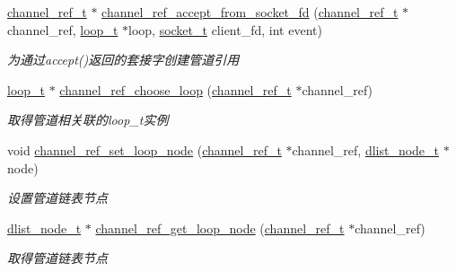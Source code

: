 \begin{DoxyCompactItemize}
\hyperlink{a00051_a151271c9d188ef28d4d24bb81dcc1263_a151271c9d188ef28d4d24bb81dcc1263}{channel\+\_\+ref\+\_\+t} $\ast$ \hyperlink{a00049_a8312d0f4fcecc79d87a261e8b462ce95_a8312d0f4fcecc79d87a261e8b462ce95}{channel\+\_\+ref\+\_\+accept\+\_\+from\+\_\+socket\+\_\+fd} (\hyperlink{a00051_a151271c9d188ef28d4d24bb81dcc1263_a151271c9d188ef28d4d24bb81dcc1263}{channel\+\_\+ref\+\_\+t} $\ast$channel\+\_\+ref, \hyperlink{a00051_a9c3ad1cd2de83e09f3a7b59fa82c94ee_a9c3ad1cd2de83e09f3a7b59fa82c94ee}{loop\+\_\+t} $\ast$loop, \hyperlink{a00051_a0d9e0afbf02fb6ed6c5b1415dce51b05_a0d9e0afbf02fb6ed6c5b1415dce51b05}{socket\+\_\+t} client\+\_\+fd, int event)
\begin{DoxyCompactList}\small\item\em 为通过accept()返回的套接字创建管道引用 \end{DoxyCompactList}\item 
\hyperlink{a00051_a9c3ad1cd2de83e09f3a7b59fa82c94ee_a9c3ad1cd2de83e09f3a7b59fa82c94ee}{loop\+\_\+t} $\ast$ \hyperlink{a00049_af3fce9f1faac3773f726b1b913d42787_af3fce9f1faac3773f726b1b913d42787}{channel\+\_\+ref\+\_\+choose\+\_\+loop} (\hyperlink{a00051_a151271c9d188ef28d4d24bb81dcc1263_a151271c9d188ef28d4d24bb81dcc1263}{channel\+\_\+ref\+\_\+t} $\ast$channel\+\_\+ref)
\begin{DoxyCompactList}\small\item\em 取得管道相关联的loop\+\_\+t实例 \end{DoxyCompactList}\item 
void \hyperlink{a00049_a98676b725d853de8a576f97e1eeb9068_a98676b725d853de8a576f97e1eeb9068}{channel\+\_\+ref\+\_\+set\+\_\+loop\+\_\+node} (\hyperlink{a00051_a151271c9d188ef28d4d24bb81dcc1263_a151271c9d188ef28d4d24bb81dcc1263}{channel\+\_\+ref\+\_\+t} $\ast$channel\+\_\+ref, \hyperlink{a00051_a62053232bcf3566010ef98a7d77c3cc8_a62053232bcf3566010ef98a7d77c3cc8}{dlist\+\_\+node\+\_\+t} $\ast$node)
\begin{DoxyCompactList}\small\item\em 设置管道链表节点 \end{DoxyCompactList}\item 
\hyperlink{a00051_a62053232bcf3566010ef98a7d77c3cc8_a62053232bcf3566010ef98a7d77c3cc8}{dlist\+\_\+node\+\_\+t} $\ast$ \hyperlink{a00049_a814d6826477cb62c5e4d6826dfdc418e_a814d6826477cb62c5e4d6826dfdc418e}{channel\+\_\+ref\+\_\+get\+\_\+loop\+\_\+node} (\hyperlink{a00051_a151271c9d188ef28d4d24bb81dcc1263_a151271c9d188ef28d4d24bb81dcc1263}{channel\+\_\+ref\+\_\+t} $\ast$channel\+\_\+ref)
\begin{DoxyCompactList}\small\item\em 取得管道链表节点 \end{DoxyCompactList}\item 

\end{DoxyCompactItemize}
